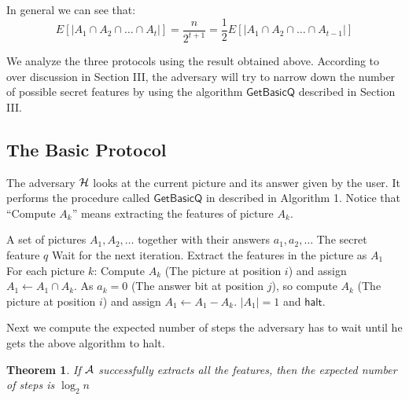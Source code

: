 \documentclass{llncs}
\begin{document}
In general we can see that: 
\[
E\left[ {\left| {A_1  \cap A_2  \cap  \ldots  \cap A_t } \right|} \right] = \frac{n}{{2^{t + 1} }} = \frac{1}{2}E\left[ {\left| {A_1  \cap A_2  \cap  \ldots  \cap A_{t - 1} } \right|} \right]
\]

We analyze the three protocols using the result obtained above. According to over discussion in Section III, the adversary will try to narrow down the number of possible secret features by using the algorithm $\mathsf{GetBasicQ}$ described in Section III. 
 
\subsection{The Basic Protocol}
The adversary ${\cal H}$ looks at the current picture and its answer given by the user. It performs the procedure called $\mathsf{GetBasicQ}$ in described in Algorithm 1. Notice that ``Compute $A_k$'' means extracting the features of picture $A_k$.

\begin{algorithm}[h!]
\caption{$\mathsf{GetBasicQ}$}\label{alg:factorial}
\begin{algorithmic}[1]
\REQUIRE A set of pictures $A_1 ,A_2 , \ldots$ together with their answers $a_1 ,a_2 , \ldots $
\ENSURE The secret feature $q$
\medskip
{}
	\STATE Wait for the next iteration.
\ELSE 
	\STATE Extract the features in the picture as $A_1$
	\REPEAT
		\STATE For each picture $k$:
			 \STATE Compute $A_k$ (The picture at position $i$) and assign $A_1  \leftarrow A_1  \cap A_k $.
		\ELSE
			 \STATE As $a_k  = 0$ (The answer bit at position $j$), so compute $A_k$ (The picture at position $i$) and assign $A_1  \leftarrow A_1  - A_k $. 
		\ENDIF
	\UNTIL $\left| {A_1 } \right| = 1$ and $\mathsf{halt}$.
\ENDIF
\end{algorithmic}
\end{algorithm}



Next we compute the expected number of steps the adversary has to wait until he gets the above algorithm to halt.

\newtheorem{theo2}{Theorem}
\begin{theo2}
If ${\cal A}$ successfully extracts all the features, then the expected number of steps is $\log _2 n$
\end{theo2}
\end{document}

